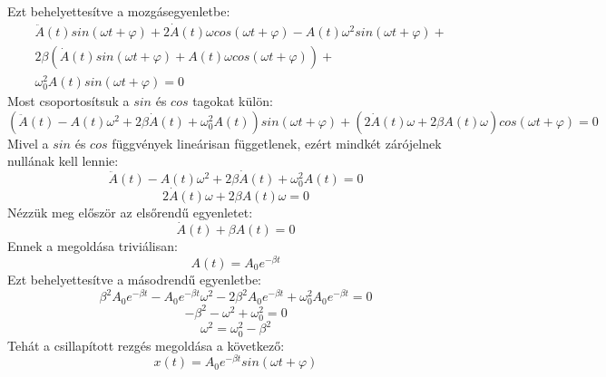\documentclass[a4paper,12pt]{article}
\begin{document}
Ezt behelyettesítve a mozgásegyenletbe:
\begin{equation}
    \begin{aligned}
        & \ddot{A}(t) sin(\omega t + \varphi) + 2\dot{A}(t) \omega cos(\omega t + \varphi) - A(t) \omega^2 sin(\omega t + \varphi) + \\
        & 2\beta \left( \dot{A}(t) sin(\omega t + \varphi) + A(t) \omega cos(\omega t + \varphi) \right) + \\
        & \omega_0^2 A(t) sin(\omega t + \varphi) = 0
    \end{aligned}
\end{equation}
Most csoportosítsuk a $sin$ és $cos$ tagokat külön:
\begin{equation}
    \left( \ddot{A}(t) - A(t) \omega^2 + 2\beta \dot{A}(t) + \omega_0^2 A(t) \right) sin(\omega t + \varphi) + \left( 2\dot{A}(t) \omega + 2\beta A(t) \omega \right) cos(\omega t + \varphi) = 0
\end{equation}
Mivel a $sin$ és $cos$ függvények lineárisan függetlenek, ezért mindkét zárójelnek nullának kell lennie:
\begin{equation}
    \ddot{A}(t) - A(t) \omega^2 + 2\beta \dot{A}(t) + \omega_0^2 A(t) = 0
\end{equation}
\begin{equation}
    2\dot{A}(t) \omega + 2\beta A(t) \omega = 0
\end{equation}
Nézzük meg először az elsőrendű egyenletet:
\begin{equation}
    \dot{A}(t) + \beta A(t) = 0
\end{equation}
Ennek a megoldása triviálisan:
\begin{equation}
    A(t) = A_0 e^{-\beta t}
\end{equation}
Ezt behelyettesítve a másodrendű egyenletbe:
\begin{equation}
    \beta^2 A_0 e^{-\beta t} - A_0 e^{-\beta t} \omega^2 - 2\beta^2 A_0 e^{-\beta t} + \omega_0^2 A_0 e^{-\beta t} = 0
\end{equation}
\begin{equation}
    -\beta^2 - \omega^2 + \omega_0^2 = 0
\end{equation}
\begin{equation}
    \omega^2 = \omega_0^2 - \beta^2
\end{equation}
Tehát a csillapított rezgés megoldása a következő:
\begin{equation}
    x(t) = A_0 e^{-\beta t} sin(\omega t + \varphi)
\end{equation}
\end{document}
